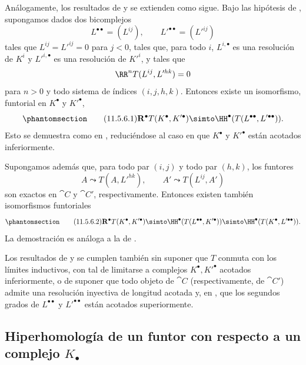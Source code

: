 \documentclass[oneside]{amsart}
\let\EGAOriginalLabel\label
\renewcommand{\label}[1]{\phantomsection\EGAOriginalLabel{#1}}
\begin{document}
\begin{env}[11.5.6]
\label{0.11.5.6}
Análogamente, los resultados de  y  se extienden como sigue.
Bajo las hipótesis de , supongamos dados dos bicomplejos
\[
  L^{\bullet\bullet}=(L^{ij}),\qquad
  L'^{\bullet\bullet}=(L'^{ij})
\]
tales que $L^{ij}=L'^{ij}=0$ para $j<0$, tales que, para todo $i$, $L^{i,\bullet}$ es una resolución de $K^i$ y $L'^{i,\bullet}$ es una resolución de $K'^i$, y tales que
\[
  \RR^nT(L^{ij},L'^{hk})=0
\]
para $n>0$ y todo sistema de índices $(i,j,h,k)$.
Entonces existe un isomorfismo, funtorial en $K^\bullet$ y $K'^\bullet$,
\[
\label{0.11.5.6.1}
\tag{11.5.6.1}
  \mathbf{R}^\bullet T(K^\bullet,K'^\bullet)
  \simto
  \HH^\bullet(T(L^{\bullet\bullet},L'^{\bullet\bullet})).
\]
Esto se demuestra como en , reduciéndose al caso en que $K^\bullet$ y $K'^\bullet$ están acotados inferiormente.

Supongamos además que, para todo par $(i,j)$ y todo par $(h,k)$, los funtores
\[
  A\leadsto T(A,L'^{hk}),
  \qquad
  A'\leadsto T(L^{ij},A')
\]
son exactos en $\cat{C}$ y $\cat{C}'$, respectivamente.
Entonces existen también isomorfismos funtoriales
\[
\label{0.11.5.6.2}
\tag{11.5.6.2}
  \mathbf{R}^\bullet T(K^\bullet,K'^\bullet)
  \simto
  \HH^\bullet(T(L^{\bullet\bullet},K'^\bullet))
  \simto
  \HH^\bullet(T(K^\bullet,L'^{\bullet\bullet})).
\]
La demostración es análoga a la de .
\end{env}

\begin{env}[11.5.7]
\label{0.11.5.7}
Los resultados de  y  se cumplen también sin suponer que $T$ conmuta con los límites inductivos, con tal de limitarse a complejos $K^\bullet,K'^\bullet$ acotados inferiormente, o de suponer que todo objeto de $\cat{C}$ (respectivamente, de $\cat{C}'$) admite una resolución inyectiva de longitud acotada y, en , que los segundos grados de $L^{\bullet\bullet}$ y $L'^{\bullet\bullet}$ están acotados superiormente.
\end{env}

\subsection{Hiperhomología de un funtor con respecto a un complejo $K_{\bullet}$}
\label{subsection:0.11.6}
\end{document}

